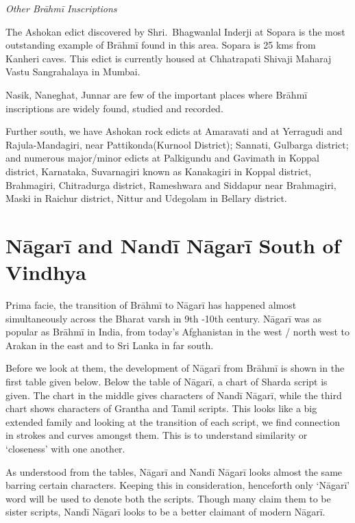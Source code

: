 \textit{Other Brāhmī Inscriptions}

The Ashokan edict discovered by Shri.\ Bhagwanlal Inderji at Sopara is the most outstanding example of Brāhmī found in this area. Sopara is 25 kms from Kanheri caves. This edict is currently housed at Chhatrapati Shivaji Maharaj Vastu Sangrahalaya in Mumbai.

Nasik, Naneghat, Junnar are few of the important places where Brāhmī inscriptions are widely found, studied and recorded.

Further south, we have Ashokan rock edicts at Amaravati and at Yerragudi and Rajula-Mandagiri, near Pattikonda(Kurnool District); Sannati, Gulbarga district; and numerous major/minor edicts at Palkigundu and Gavimath in Koppal district, Karnataka, Suvarnagiri known as Kanakagiri in Koppal district, Brahmagiri, Chitradurga district, Rameshwara and Siddapur near Brahmagiri, Maski in Raichur district, Nittur and Udegolam in Bellary district.


\section*{Nāgarī and Nandī Nāgarī South of Vindhya}

Prima facie, the transition of Brāhmī to Nāgarī has happened almost simultaneously across the Bharat varsh in 9th -10th century. Nāgarī was as popular as Brāhmī in India, from today’s Afghanistan in the west / north west to Arakan in the east and to Sri Lanka in far south.

Before we look at them, the development of Nāgarī from Brāhmī is shown in the first table given below. Below the table of Nāgarī, a chart of Sharda script is given. The chart in the middle gives characters of Nandī Nāgarī, while the third chart shows characters of Grantha and Tamil scripts. This looks like a big extended family and looking at the transition of each script, we find connection in strokes and curves amongst them. This is to understand similarity or ‘closeness’ with one another.

As understood from the tables, Nāgarī and Nandī Nāgarī looks almost the same barring certain characters. Keeping this in consideration, henceforth only ‘Nāgarī’ word will be used to denote both the scripts. Though many claim them to be sister scripts, Nandī Nāgarī looks to be a better claimant of modern Nāgarī.

